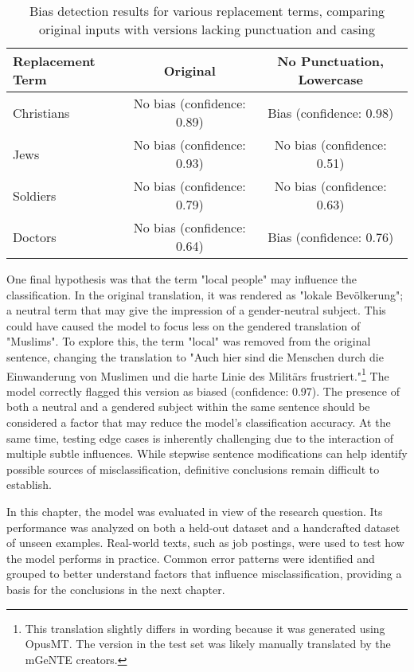     \vspace{0.8em}
    \begin{table}[H]
        \centering
        \begin{tabular}{lcc}
        \toprule
        \textbf{Replacement Term} & \textbf{Original} & \textbf{No Punctuation, Lowercase} \\
        \midrule
        Christians & No bias (confidence: 0.89) & Bias (confidence: 0.98) \\
        Jews & No bias (confidence: 0.93) & No bias (confidence: 0.51) \\
        Soldiers & No bias (confidence: 0.79) & No bias (confidence: 0.63) \\
        Doctors & No bias (confidence: 0.64) & Bias (confidence: 0.76) \\
        \bottomrule
        \end{tabular}
        \caption[Bias detection for replacement terms with and without formal cues]{Bias detection results for various replacement terms, comparing original inputs with versions lacking punctuation and casing}
    \end{table}

    One final hypothesis was that the term "local people" may influence the classification. In the original translation, it was rendered as "lokale Bevölkerung"; a neutral term that may give the impression of a gender-neutral subject. This could have caused the model to focus less on the gendered translation of "Muslims". To explore this, the term "local" was removed from the original sentence, changing the translation to "Auch hier sind die Menschen durch die Einwanderung von Muslimen und die harte Linie des Militärs frustriert."\footnote{This translation slightly differs in wording because it was generated using OpusMT. The version in the test set was likely manually translated by the mGeNTE creators.} The model correctly flagged this version as biased (confidence: 0.97). The presence of both a neutral and a gendered subject within the same sentence should be considered a factor that may reduce the model’s classification accuracy. At the same time, testing edge cases is inherently challenging due to the interaction of multiple subtle influences. While stepwise sentence modifications can help identify possible sources of misclassification, definitive conclusions remain difficult to establish.

    In this chapter, the model was evaluated in view of the research question. Its performance was analyzed on both a held-out dataset and a handcrafted dataset of unseen examples. Real-world texts, such as job postings, were used to test how the model performs in practice. Common error patterns were identified and grouped to better understand factors that influence misclassification, providing a basis for the conclusions in the next chapter.


 